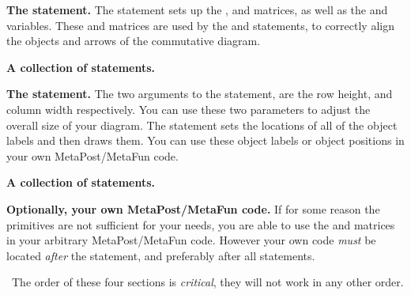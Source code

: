 \startitemize[n]

\item {\bf The  statement.} The  
statement sets up the , and  matrices, as well as 
the  and  variables. These  and 
 matrices are used by the  and  
statements, to correctly align the objects and arrows of the commutative 
diagram.

\item {\bf A collection of  statements.}

\item {\bf The  statement.} The two arguments to the 
 statement, are the row height, and column width 
respectively. You can use these two parameters to adjust the overall size 
of your diagram. The  statement sets the locations of 
all of the object labels and then draws them. You can use these object 
labels or object positions in your own MetaPost/MetaFun code. 

\item {\bf A collection of  statements.}

\item {\bf Optionally, your own MetaPost/MetaFun code.} If for some reason 
the  primitives are not sufficient for your needs, you 
are able to use the  and  matrices in your 
arbitrary MetaPost/MetaFun code. However your own code \emph{must} be 
located \emph{after} the  statement, and preferably 
after all  statements. 

\stopitemize

\noindent\ The order of these four sections is \emph{critical}, they will 
not work in any other order.

\stopchapter 